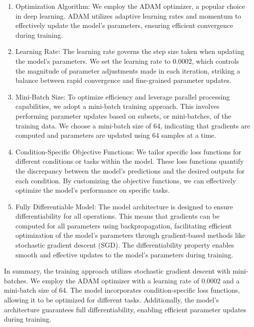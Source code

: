 \documentclass{midl} %
\begin{document}
\begin{enumerate}
  \item Optimization Algorithm: We employ the ADAM optimizer, a popular choice in deep learning. ADAM utilizes adaptive learning rates and momentum to effectively update the model's parameters, ensuring efficient convergence during training.

  \item Learning Rate: The learning rate governs the step size taken when updating the model's parameters. We set the learning rate to 0.0002, which controls the magnitude of parameter adjustments made in each iteration, striking a balance between rapid convergence and fine-grained parameter updates.

  \item Mini-Batch Size: To optimize efficiency and leverage parallel processing capabilities, we adopt a mini-batch training approach. This involves performing parameter updates based on subsets, or mini-batches, of the training data. We choose a mini-batch size of 64, indicating that gradients are computed and parameters are updated using 64 samples at a time.

  \item Condition-Specific Objective Functions: We tailor specific loss functions for different conditions or tasks within the model. These loss functions quantify the discrepancy between the model's predictions and the desired outputs for each condition. By customizing the objective functions, we can effectively optimize the model's performance on specific tasks.

  \item Fully Differentiable Model: The model architecture is designed to ensure differentiability for all operations. This means that gradients can be computed for all parameters using backpropagation, facilitating efficient optimization of the model's parameters through gradient-based methods like stochastic gradient descent (SGD). The differentiability property enables smooth and effective updates to the model's parameters during training.
\end{enumerate}

In summary, the training approach utilizes stochastic gradient descent with mini-batches. We employ the ADAM optimizer with a learning rate of 0.0002 and a mini-batch size of 64. The model incorporates condition-specific loss functions, allowing it to be optimized for different tasks. Additionally, the model's architecture guarantees full differentiability, enabling efficient parameter updates during training.
\end{document}
